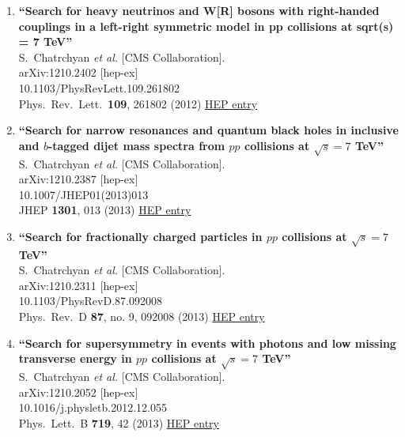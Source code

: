 \documentclass{article}
\begin{document}
\begin{enumerate}
\item%
{\bf ``Search for heavy neutrinos and W[R] bosons with right-handed couplings in a left-right symmetric model in pp collisions at sqrt(s) = 7 TeV''}
  \\{}S.~Chatrchyan {\it et al.} [CMS Collaboration].
  \\{}arXiv:1210.2402 [hep-ex]
    \\{}10.1103/PhysRevLett.109.261802
\\{}Phys.\ Rev.\ Lett.\  {\bf 109}, 261802 (2012) %
\href{http://inspirehep.net/record/1189986}{HEP entry}


\item%
{\bf ``Search for narrow resonances and quantum black holes in inclusive and $b$-tagged dijet mass spectra from $pp$ collisions at $\sqrt{s}=7$ TeV''}
  \\{}S.~Chatrchyan {\it et al.} [CMS Collaboration].
  \\{}arXiv:1210.2387 [hep-ex]
    \\{}10.1007/JHEP01(2013)013
\\{}JHEP {\bf 1301}, 013 (2013) %
\href{http://inspirehep.net/record/1189823}{HEP entry}


\item%
{\bf ``Search for fractionally charged particles in $pp$ collisions at $\sqrt{s}=7$ TeV''}
  \\{}S.~Chatrchyan {\it et al.} [CMS Collaboration].
  \\{}arXiv:1210.2311 [hep-ex]
    \\{}10.1103/PhysRevD.87.092008
\\{}Phys.\ Rev.\ D {\bf 87}, no. 9, 092008 (2013) %
\href{http://inspirehep.net/record/1189819}{HEP entry}


\item%
{\bf ``Search for supersymmetry in events with photons and low missing transverse energy in $pp$ collisions at $\sqrt{s}=7$ TeV''}
  \\{}S.~Chatrchyan {\it et al.} [CMS Collaboration].
  \\{}arXiv:1210.2052 [hep-ex]
    \\{}10.1016/j.physletb.2012.12.055
\\{}Phys.\ Lett.\ B {\bf 719}, 42 (2013) %
\href{http://inspirehep.net/record/1189815}{HEP entry}



\end{enumerate}
\end{document}
